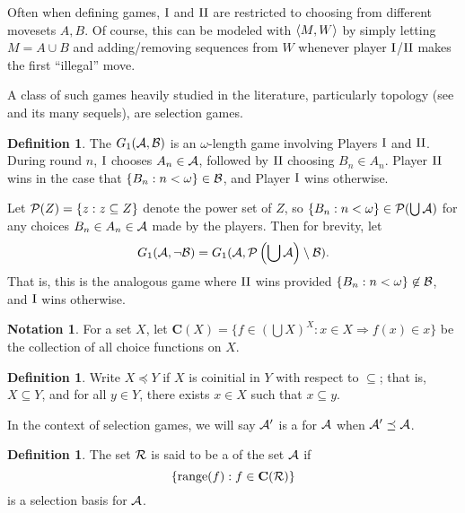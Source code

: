 \documentclass{amsart}
\theoremstyle{plain}
\theoremstyle{definition}
\newtheorem{definition}[theorem]{Definition}
\newtheorem{notation}[theorem]{Notation}
\theoremstyle{remark}
\theoremstyle{plain}
\theoremstyle{definition}
\theoremstyle{remark}
\begin{document}
Often when defining games, \(\mathrm{I}\) and \(\mathrm{II}\) are restricted to choosing
from different movesets \(A,B\). Of course, this can be modeled with \(\langle M,W\rangle\)
by simply letting \(M=A\cup B\) and adding/removing sequences from \(W\)
whenever player \(\mathrm{I}\)/\(\mathrm{II}\) makes the first ``illegal'' move.

A class of such games heavily studied in the literature, particularly
topology (see \cite{MR1378387} and its
many sequels), are selection games.

\begin{definition}
  The  \(G_{1}(\mathcal{A},\mathcal{B})\) 
  is an \(\omega\)-length game involving Players \(\mathrm{I}\) and \(\mathrm{II}\). 
  During round \(n\), \(\mathrm{I}\) chooses
  \(A_n\in\mathcal{A}\), followed by \(\mathrm{II}\) choosing \(B_n\in A_n\).
  Player \(\mathrm{II}\) wins in the case that \(\{B_n:n<\omega\}\in\mathcal{B}\),
  and Player \(\mathrm{I}\) wins otherwise.
\end{definition}

  Let \(\mathcal{P}(Z)=\{z:z\subseteq Z\}\) denote the power set of \(Z\),
  so \(\{B_n:n<\omega\}\in\mathcal{P}(\bigcup\mathcal{A})\) for any choices
  \(B_n\in A_n\in\mathcal{A}\) made by the players.
  Then for brevity, let 
  \[
    G_{1}(\mathcal{A},\neg \mathcal{B})
      =
    G_{1}(\mathcal{A},\mathcal{P}\left(\bigcup \mathcal{A}\right)\setminus \mathcal{B})
  .\]
  That is, this is the analogous game where
  \(\mathrm{II}\) wins provided \(\{B_n:n<\omega\}\not\in\mathcal{B}\),
  and \(\mathrm{I}\) wins otherwise.

\begin{notation}
  For a set \(X\), let \(\mathbf C(X)=\{f\in(\bigcup X)^X:x\in X\Rightarrow f(x)\in x\}\)
  be the collection of all choice functions on \(X\).
\end{notation}

\begin{definition}
  Write \(X\preceq Y\) if \(X\) is coinitial in \(Y\) with respect to \(\subseteq\);
  that is, \(X\subseteq Y\), and for all \(y\in Y\), there exists \(x\in X\) such that 
  \(x\subseteq y\).

  In the context of selection games, we will say \(\mathcal{A}'\) is a 
  for \(\mathcal{A}\) when \(\mathcal{A}'\preceq \mathcal{A}\).
\end{definition}

\begin{definition}
  The set \(\mathcal{R}\) is said to be a  of the set \(\mathcal{A}\)
  if \[\{\text{range}(f):f\in\mathbf C(\mathcal{R})\}\] is a selection basis for \(\mathcal{A}\).
\end{definition}
\end{document}
